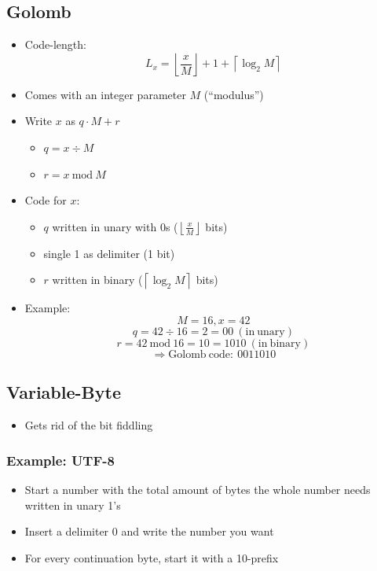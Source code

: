 \documentclass[a4paper]{scrartcl}
\begin{document}
\subsection{Golomb}
\label{sec:golomb}
\begin{itemize}
\item Code-length:
  \[L_x = \left\lfloor \frac{x}{M} \right\rfloor + 1 +
  \left\lceil \log_2 M \right\rceil\]
\item Comes with an integer parameter $M$ (``modulus'')
\item Write $x$ as $q\cdot M + r$
  \begin{itemize}
  \item $q = x \div M$
  \item $r = x\ \mathrm{mod}\ M$
  \end{itemize}
\item Code for $x$:
  \begin{itemize}
  \item $q$ written in unary with 0s ($\left\lfloor {\frac{x}{M}} \right\rfloor$
    bits)
  \item single 1 as delimiter (1 bit)
  \item $r$ written in binary ($\left\lceil {\log_2 M} \right\rceil$ bits)
  \end{itemize}
\item Example:
  \[M=16, x=42\]
  \[q = 42\div 16 = 2 = 00\ \mathrm{(in\ unary)}\]
  \[r = 42\ \mathrm{mod}\ 16 = 10 = 1010\ \mathrm{(in\ binary)}\]
  \[\Rightarrow \mathrm{Golomb\ code:}\ 0011010\]
\end{itemize}
\subsection{Variable-Byte}
\label{sec:variable_byte}

\begin{itemize}
\item Gets rid of the bit fiddling
\end{itemize}

\subsubsection{Example: UTF-8}
\label{sec:utf-8}
\begin{itemize}
\item Start a number with the total amount of bytes the whole number needs
  written in unary 1's
\item Insert a delimiter 0 and write the number you want
\item For every continuation byte, start it with a 10-prefix
\end{itemize}
\end{document}
